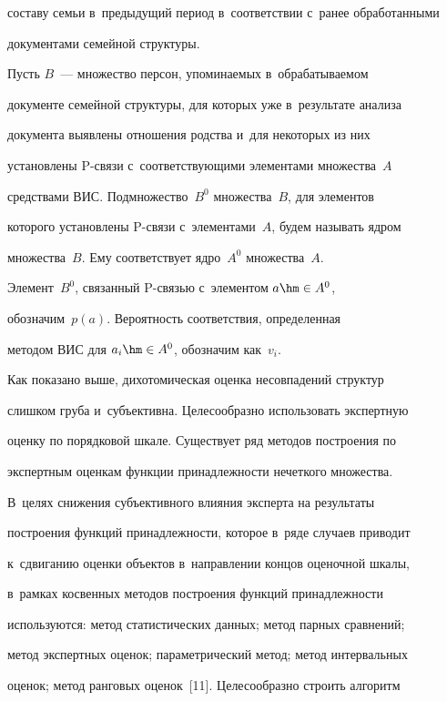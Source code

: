 составу семьи в~предыдущий период в~соответствии с~ранее обработанными 


документами семейной структуры. 


  


  


  Пусть $B$~--- множество персон, упоминаемых в~обрабатываемом 


документе семейной структуры, для которых уже в~результате анализа 


документа выявлены отношения родства и~для некоторых из них 


установлены P-свя\-зи с~соответствующими элементами множества~$A$ 


средствами ВИС. Подмножество~$B^0$ множества~$B$, для элементов 


которого установлены P-свя\-зи с~элементами~$A$, будем называть ядром 


множества~$B$. Ему соответствует ядро~$A^0$ множества~$A$. 


Элемент~$B^0$, связанный \mbox{P-связью} с~элементом $a\hm\in A^0$, 


обозначим~$p(a)$. Вероятность соответствия, определенная 


методом ВИС для $a_i\hm\in A^0$, обозначим как~$v_i$.


  


  Как показано выше, дихотомическая оценка несовпадений структур 


слишком груба и~субъективна. Целесообразно использовать экспертную 


оценку по порядковой шкале. Существует ряд методов построения по 


экспертным оценкам функции принадлежности нечеткого множества. 


В~целях снижения субъективного влияния эксперта на результаты 


построения функций принадлежности, которое в~ряде случаев приводит 


к~сдвиганию оценки объектов в~направлении концов оценочной шкалы, 


в~рамках косвенных методов построения функций принадлежности 


используются: метод статистических данных; метод парных сравнений; 


метод экспертных оценок; параметрический метод; метод интервальных 


оценок; метод ранговых оценок~[11]. Целесообразно строить алгоритм 



